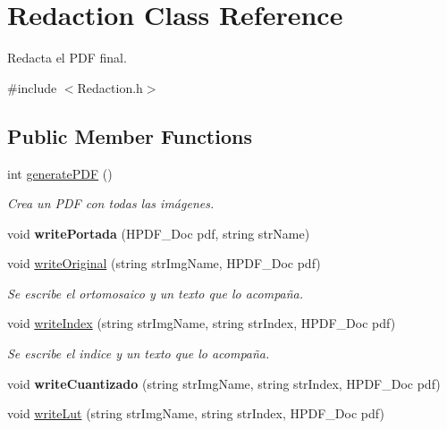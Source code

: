 \hypertarget{classRedaction}{}\section{Redaction Class Reference}
\label{classRedaction}


Redacta el P\+DF final.  




{\ttfamily \#include $<$Redaction.\+h$>$}

\subsection*{Public Member Functions}
\begin{DoxyCompactItemize}
\item 
int \mbox{\hyperlink{classRedaction_a4659115b2df63c9e0694c7f7cf325ff6}{generate\+P\+DF}} ()
\begin{DoxyCompactList}\small\item\em Crea un P\+DF con todas las imágenes. \end{DoxyCompactList}\item 
\mbox{\label{classRedaction_a469bf3427fb89a1c93c0fdda38ab5de1}} 
void {\bfseries write\+Portada} (H\+P\+D\+F\+\_\+\+Doc pdf, string str\+Name)
\item 
void \mbox{\hyperlink{classRedaction_a95d771b7dcd46c323876a0ad597d46e4}{write\+Original}} (string str\+Img\+Name, H\+P\+D\+F\+\_\+\+Doc pdf)
\begin{DoxyCompactList}\small\item\em Se escribe el ortomosaico y un texto que lo acompaña. \end{DoxyCompactList}\item 
void \mbox{\hyperlink{classRedaction_a5eb1526e3796eb6c1df1a78854d4f9d0}{write\+Index}} (string str\+Img\+Name, string str\+Index, H\+P\+D\+F\+\_\+\+Doc pdf)
\begin{DoxyCompactList}\small\item\em Se escribe el indice y un texto que lo acompaña. \end{DoxyCompactList}\item 
\mbox{\label{classRedaction_a4e5995467609e29e715088fe0495d55a}} 
void {\bfseries write\+Cuantizado} (string str\+Img\+Name, string str\+Index, H\+P\+D\+F\+\_\+\+Doc pdf)
\item 
void \mbox{\hyperlink{classRedaction_a1b092fb88b89ca238da44111f6a67ddc}{write\+Lut}} (string str\+Img\+Name, string str\+Index, H\+P\+D\+F\+\_\+\+Doc pdf)

\end{DoxyCompactItemize}
